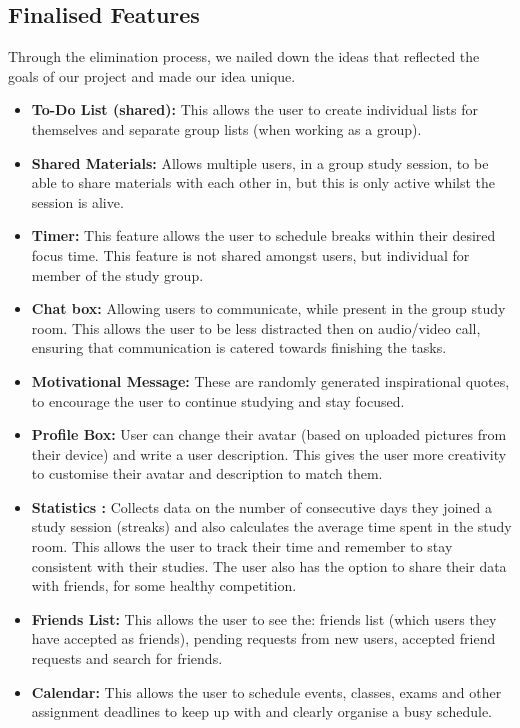 \subsection{Finalised Features} Through the elimination process, we nailed down the ideas that reflected the goals of our project and made our idea unique.
\begin{itemize}
    \item \textbf{To-Do List (shared):} This allows the user to create individual lists for themselves and separate group lists (when working as a group).
    \item \textbf{Shared Materials:} Allows multiple users, in a group study session, to be able to share materials with each other in, but this is only active whilst the session is alive.
    \item \textbf{Timer:} This feature allows the user to schedule breaks within their desired focus time. This feature is not shared amongst users, but individual for member of the study group.
    \item \textbf{Chat box:} Allowing users to communicate, while present in the group study room. This allows the user to be less distracted then on audio/video call, ensuring that communication is catered towards finishing the tasks.
    \item \textbf{Motivational Message:} These are randomly generated inspirational quotes, to encourage the user to continue studying and stay focused.
    \item \textbf{Profile Box:}  User can change their avatar (based on uploaded pictures from their device) and write a user description. This gives the user more creativity to customise their avatar and description to match them.
    \item \textbf{Statistics :} Collects data on the number of consecutive days they joined a study session (streaks) and also calculates the average time spent in the study room. This allows the user to track their time and remember to stay consistent with their studies. The user also has the option to share their data with friends, for some healthy competition.
    \item \textbf{Friends List:} This allows the user to see the: friends list (which users they have accepted as friends), pending requests from new users, accepted friend requests and search for friends.
    \item \textbf{Calendar:} This allows the user to schedule events, classes, exams and other assignment deadlines to keep up with and clearly organise a busy schedule.

\end{itemize}
